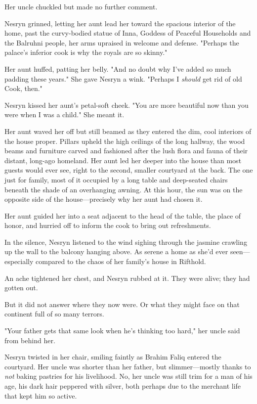 Her uncle chuckled but made no further comment.

Nesryn grinned, letting her aunt lead her toward the spacious interior of the home, past the curvy-bodied statue of Inna, Goddess of Peaceful Households and the Balruhni people, her arms upraised in welcome and defense. "Perhaps the palace's inferior cook is why the royals are so skinny."

Her aunt huffed, patting her belly. "And no doubt why I've added so much padding these years." She gave Nesryn a wink. "Perhaps I
\emph{should} get rid of old Cook, then."

Nesryn kissed her aunt's petal-soft cheek. "You are more beautiful now than you were when I was a child." She meant it.

Her aunt waved her off but still beamed as they entered the dim, cool interiors of the house proper. Pillars upheld the high ceilings of the long hallway, the wood beams and furniture carved and fashioned after the lush flora and fauna of their distant, long-ago homeland. Her aunt led her deeper into the house than most guests would ever see, right to the second, smaller courtyard at the back. The one just for family, most of it occupied by a long table and deep-seated chairs beneath the shade of an overhanging awning. At this hour, the sun was on the opposite side of the house---precisely why her aunt had chosen it.

Her aunt guided her into a seat adjacent to the head of the table, the place of honor, and hurried off to inform the cook to bring out refreshments.

In the silence, Nesryn listened to the wind sighing through the jasmine crawling up the wall to the balcony hanging above. As serene a home as she'd ever seen---especially compared to the chaos of her family's house in Rifthold.

An ache tightened her chest, and Nesryn rubbed at it. They were alive;
they had gotten out.

But it did not answer where they now were. Or what they might face on that continent full of so many terrors.

"Your father gets that same look when he's thinking too hard," her uncle said from behind her.

Nesryn twisted in her chair, smiling faintly as Brahim Faliq entered the courtyard. Her uncle was shorter than her father, but slimmer---mostly thanks to \emph{not} baking pastries for his livelihood. No, her uncle was still trim for a man of his age, his dark hair peppered with silver, both perhaps due to the merchant life that kept him so active.

